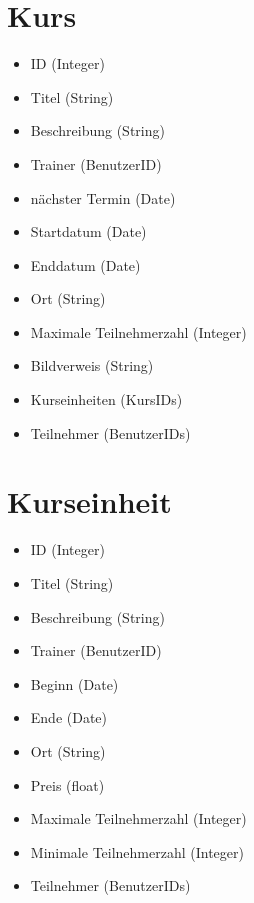 \documentclass[a4paper]{scrreprt}
\newcounter{Lc}
\newcounter{Hc}
\newcommand{\stepHc}{\stepcounter{Hc}\setcounter{Lc}{0}}
\begin{document}
	    
\stepHc		    	
	\section{Kurs}
	   \Func {} 
		 \begin{itemize}
		   	\item ID (Integer)
		   	\item Titel (String)
		   	\item Beschreibung (String)
		   	\item Trainer (BenutzerID)
		   	\item nächster Termin (Date)
		   	\item Startdatum (Date)
		   	\item Enddatum (Date)
		   	\item Ort (String)
		   	\item Maximale Teilnehmerzahl (Integer)
		   	\item Bildverweis (String)
		   	\item Kurseinheiten (KursIDs)
		   	\item Teilnehmer (BenutzerIDs)
	    \end{itemize}
\stepHc		    
	\section{Kurseinheit}
	 \Func {} 
		 \begin{itemize}
		 	\item ID (Integer)
		 	\item Titel (String)
		 	\item Beschreibung (String)
		 	\item Trainer (BenutzerID)
		 	\item Beginn (Date)
		 	\item Ende (Date)
		 	\item Ort (String)
		 	\item Preis (\gls{float})
		 	\item Maximale Teilnehmerzahl (Integer)
		 	\item Minimale Teilnehmerzahl (Integer)
		 	\item Teilnehmer (BenutzerIDs)
		 \end{itemize}   
    
    
\stepHc	   		
\end{document}
